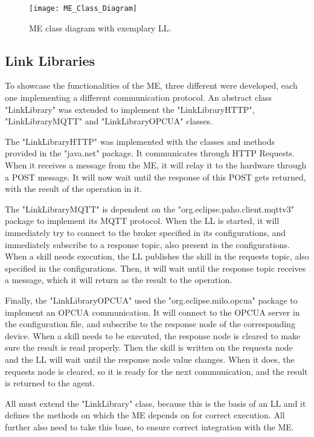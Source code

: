 \begin{figure}[h!]
	\centering
	\texttt{[image: ME\_Class\_Diagram]}
	\caption{\acrlong{ME} class diagram with exemplary \acrlong{LL}.}
	\label{fig:module_engine_class_diagram}
\end{figure}

\subsection{Link Libraries}
\label{subsec:link_library_class}

To showcase the functionalities of the \acrshort{ME}, three different  were developed, each one implementing a different communication protocol. An abstract class "LinkLibrary" was extended to implement the "LinkLibraryHTTP", "LinkLibraryMQTT" and "LinkLibraryOPCUA" classes.

The "LinkLibraryHTTP" was implemented with the classes and methods provided in the "java.net" package. It communicates through \acrshort{HTTP} Requests. When it receives a message from the \acrshort{ME}, it will relay it to the hardware through a POST message. It will now wait until the response of this POST gets returned, with the result of the operation in it.

The "LinkLibraryMQTT" is dependent on the "org.eclipse.paho.client.mqttv3" package to implement its \acrshort{MQTT} protocol. When the \acrshort{LL} is started, it will immediately try to connect to the broker specified in its configurations, and immediately subscribe to a response topic, also present in the configurations. When a skill needs execution, the \acrshort{LL} publishes the skill in the requests topic, also specified in the configurations. Then, it will wait until the response topic receives a message, which it will return as the result to the operation.

Finally, the "LinkLibraryOPCUA" used the "org.eclipse.milo.opcua" package to implement an \acrshort{OPCUA} communication. It will connect to the \acrshort{OPCUA} server in the configuration file, and subscribe to the response node of the corresponding device. When a skill needs to be executed, the response node is cleared to make sure the result is read properly. Then the skill is written on the requests node and the \acrshort{LL} will wait until the response node value changes. When it does, the requests node is cleared, so it is ready for the next communication, and the result is returned to the agent.

All  must extend the "LinkLibrary" class, because this is the basis of an \acrshort{LL} and it defines the methods on which the \acrlong{ME} depends on for correct execution. All further  also need to take this base, to ensure correct integration with the \acrshort{ME}.

